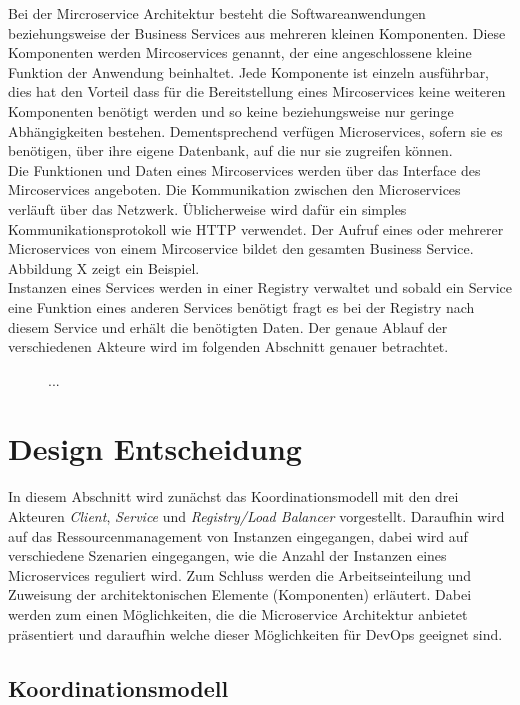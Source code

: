 Bei der Mircroservice Architektur besteht die Softwareanwendungen beziehungsweise der Business Services aus mehreren kleinen Komponenten. Diese Komponenten werden Mircoservices genannt, der eine angeschlossene kleine Funktion der Anwendung beinhaltet. Jede Komponente ist einzeln ausführbar, dies hat den Vorteil dass für die Bereitstellung eines Mircoservices keine weiteren Komponenten benötigt werden und so keine beziehungsweise nur geringe Abhängigkeiten bestehen. Dementsprechend verfügen Microservices, sofern sie es benötigen, über ihre eigene Datenbank, auf die nur sie zugreifen können. \\
Die Funktionen und Daten eines Mircoservices werden über das Interface des Mircoservices angeboten. Die Kommunikation zwischen den Microservices verläuft über das Netzwerk. Üblicherweise wird dafür ein simples Kommunikationsprotokoll wie HTTP verwendet. Der Aufruf eines oder mehrerer Microservices von einem Mircoservice bildet den gesamten Business Service. Abbildung X zeigt ein Beispiel. \\
Instanzen eines Services werden in einer Registry verwaltet und sobald ein Service eine Funktion eines anderen Services benötigt fragt es bei der Registry nach diesem Service und erhält die benötigten Daten. Der genaue Ablauf der verschiedenen Akteure wird im folgenden Abschnitt genauer betrachtet.\\

\begin{figure}[h]
...
\end{figure}

\section{Design Entscheidung}
In diesem Abschnitt wird zunächst das Koordinationsmodell mit den drei Akteuren \textit{Client}, \textit{Service} und \textit{Registry/Load Balancer} vorgestellt. Daraufhin wird auf das Ressourcenmanagement von Instanzen eingegangen, dabei wird auf verschiedene Szenarien eingegangen, wie die Anzahl der Instanzen eines Microservices reguliert wird. Zum Schluss werden die Arbeitseinteilung und Zuweisung der architektonischen Elemente (Komponenten) erläutert. Dabei werden zum einen Möglichkeiten, die die Microservice Architektur anbietet präsentiert und daraufhin welche dieser Möglichkeiten für DevOps geeignet sind.

\subsection{Koordinationsmodell}

